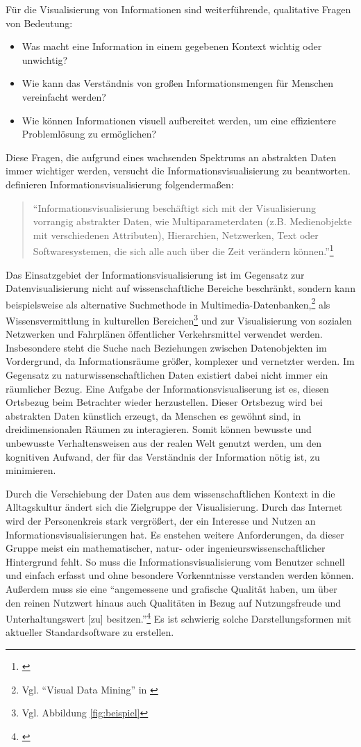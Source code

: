 \documentclass[a4paper, 
               12pt,
               DIV=calc,
               version=first,
               pdftex,
               headsepline,
               footsepline,
               bibliography=totocnumbered,
               listof=numbered]{scrreprt}
\begin{document}
Für die Visualisierung von Informationen sind weiterführende, qualitative Fragen von Bedeutung:
\begin{itemize}
\item Was macht eine Information in einem gegebenen Kontext wichtig oder unwichtig?
\item Wie kann das Verständnis von großen Informationsmengen für Menschen vereinfacht werden?
\item Wie können Informationen visuell aufbereitet werden, um eine effizientere Problemlösung zu ermöglichen?
\end{itemize}
Diese Fragen, die aufgrund eines wachsenden Spektrums an abstrakten Daten immer wichtiger werden,
versucht die Informationsvisualisierung zu beantworten.
\cite{Preim} definieren Informationsvisualisierung folgendermaßen:
\begin{quote}
"`Informationsvisualisierung beschäftigt sich mit der Visualisierung vorrangig abstrakter Daten, wie
Multiparameterdaten (z.B. Medienobjekte mit verschiedenen Attributen), Hierarchien, Netzwerken, Text
oder Softwaresystemen, die sich alle auch über die Zeit verändern können."'\footnote{\citep[S.\,434]{Preim}}
\end{quote}
Das Einsatzgebiet der Informationsvisualisierung ist im Gegensatz zur Datenvisualisierung nicht
auf wissenschaftliche Bereiche beschränkt,
sondern kann beispielsweise als alternative Suchmethode in Multimedia-Datenbanken,\footnote{Vgl. "`Visual Data Mining"' in \citep{Keim}}
als Wissensvermittlung in kulturellen Bereichen\footnote{Vgl. Abbildung \ref{fig:beispiel}} und zur Visualisierung von
sozialen Netzwerken und Fahrplänen öffentlicher Verkehrsmittel verwendet werden.
Insbesondere steht die Suche nach Beziehungen zwischen Datenobjekten im Vordergrund,
da Informationsräume größer, komplexer und vernetzter werden. Im Gegensatz
zu naturwissenschaftlichen Daten existiert dabei nicht immer ein räumlicher Bezug.
Eine Aufgabe der Informationsvisualiserung ist es, diesen Ortsbezug beim Betrachter wieder herzustellen.
Dieser Ortsbezug wird bei abstrakten Daten künstlich erzeugt, da
Menschen es gewöhnt sind, in dreidimensionalen Räumen zu interagieren.
Somit können bewusste und unbewusste Verhaltensweisen aus der realen Welt genutzt werden, um den
kognitiven Aufwand, der für das Verständnis der Information nötig ist, zu minimieren.

Durch die Verschiebung der Daten aus dem wissenschaftlichen Kontext
in die Alltagskultur ändert sich die Zielgruppe der Visualisierung. Durch das Internet
wird der Personenkreis stark vergrößert, der ein Interesse und Nutzen an Informationsvisualisierungen
hat. Es enstehen weitere Anforderungen, da dieser Gruppe meist ein mathematischer, natur- oder ingenieurswissenschaftlicher Hintergrund
fehlt. So muss die Informationsvisualisierung vom Benutzer
schnell und einfach erfasst und ohne besondere Vorkenntnisse verstanden werden können.
Außerdem muss sie eine "`angemessene und grafische Qualität haben, um über den
reinen Nutzwert hinaus auch Qualitäten in Bezug auf Nutzungsfreude und Unterhaltungswert [zu] besitzen."'\footnote{\citep[S.\,438]{Preim}}
Es ist schwierig solche Darstellungsformen mit aktueller Standardsoftware zu erstellen.
\end{document}
